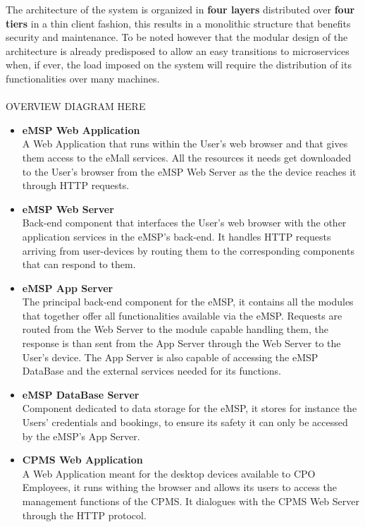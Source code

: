 \documentclass[11pt]{article}
\begin{document}
The architecture of the system is organized in \textbf{four layers} distributed over \textbf{four tiers} in a thin client fashion, this results in a monolithic structure that benefits security and maintenance. To be noted however that the modular design of the architecture is already predisposed to allow an easy transitions to microservices when, if ever, the load imposed on the system will require the distribution of its functionalities over many machines. \\
\\
OVERVIEW DIAGRAM HERE

\begin{itemize}
    \item \textbf{eMSP Web Application} \\
        A Web Application that runs within the User’s web browser and that gives them access to the eMall services. All the resources it needs get downloaded to the User's browser from the eMSP Web Server as the the device reaches it through HTTP requests.
    \item \textbf{eMSP Web Server} \\
        Back-end component that interfaces the User's web browser with the other application services in the eMSP's back-end. It handles HTTP requests arriving from user-devices by routing them to the corresponding components that can respond to them.
    \item \textbf{eMSP App Server} \\
        The principal back-end component for the eMSP, it contains all the modules that together offer all functionalities available via the eMSP. Requests are routed from the Web Server to the module capable handling them, the response is than sent from the App Server through the Web Server to the User's device. The App Server is also capable of accessing the eMSP DataBase and the external services needed for its functions.
    \item \textbf{eMSP DataBase Server} \\
        Component dedicated to data storage for the eMSP, it stores for instance the Users' credentials and bookings, to ensure its safety it can only be accessed by the eMSP's App Server.
    \item \textbf{CPMS Web Application} \\
        A Web Application meant for the desktop devices available to CPO Employees, it runs withing the browser and allows its users to access the management functions of the CPMS. It dialogues with the CPMS Web Server through the HTTP protocol.

\end{itemize}
\end{document}
